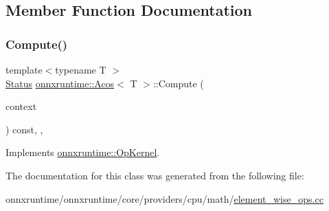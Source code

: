 \subsection{Member Function Documentation}
\mbox{\label{classonnxruntime_1_1Acos_a571d0fb308a9e448a4621cd6b1f28926}} 
\subsubsection{\texorpdfstring{Compute()}{Compute()}}
{\footnotesize\ttfamily template$<$typename T $>$ \\
\mbox{\hyperlink{classonnxruntime_1_1common_1_1Status}{Status}} \mbox{\hyperlink{classonnxruntime_1_1Acos}{onnxruntime\+::\+Acos}}$<$ T $>$\+::Compute (\begin{DoxyParamCaption}\item[{\mbox{\hyperlink{classonnxruntime_1_1OpKernelContext}{Op\+Kernel\+Context}} $\ast$}]{context }\end{DoxyParamCaption}) const\hspace{0.3cm}{\ttfamily [inline]}, {\ttfamily [override]}, {\ttfamily [virtual]}}



Implements \mbox{\hyperlink{classonnxruntime_1_1OpKernel_a9eca8656a78b1b3ab9d3351a12798650}{onnxruntime\+::\+Op\+Kernel}}.



The documentation for this class was generated from the following file\+:\begin{DoxyCompactItemize}
\item 
onnxruntime/onnxruntime/core/providers/cpu/math/\mbox{\hyperlink{element__wise__ops_8cc}{element\+\_\+wise\+\_\+ops.\+cc}}\end{DoxyCompactItemize}
